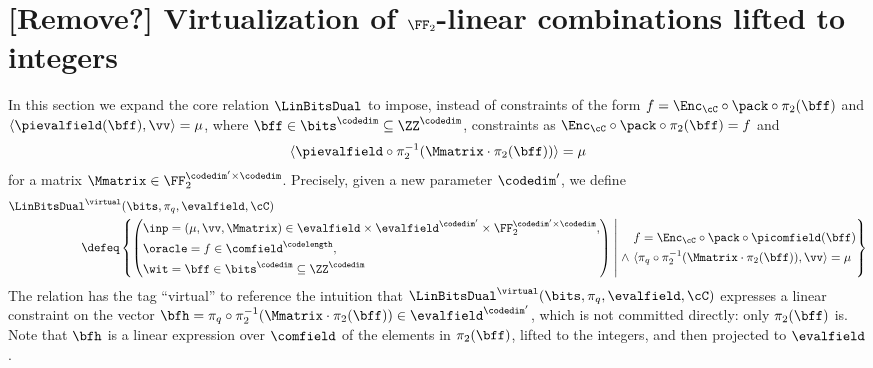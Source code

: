 \section{[Remove?] Virtualization of $\FF_2$-linear combinations lifted to integers}\label{s:virtualization}



In this section we expand the core relation $\LinBitsDual$ to impose, instead of constraints of the form $f=\Enc_\cC\circ \pack\circ \pi_2(\bff)$ and $\langle \pievalfield(\bff), \vv  \rangle = \mu$, where $\bff\in \bits^{\codedim} \subseteq \ZZ^{\codedim}$, constraints as $\Enc_\cC\circ\pack\circ\pi_2(\bff) = f$  and $$\langle \pievalfield\circ \pi_2^{-1}(\Mmatrix\cdot \pi_2(\bff)) \rangle = \mu$$ for a matrix $\Mmatrix\in \FF_{2}^{\codedim' \times \codedim}$. Precisely, given a new parameter $\codedim'$, we define 
%
\begin{align*}
&\LinBitsDual^\virtual(\bits,\pi_q, \evalfield,\cC)\\ &\qquad \qquad \qquad \defeq \left\{ \left(\begin{aligned} &\inp=(\mu, \vv, \Mmatrix)\in \evalfield \times \evalfield^{\codedim'} \times \FF_2^{\codedim' \times \codedim}, \\&\oracle = f \in \comfield^\codelength, \\ &\wit= \bff\in \bits^\codedim \subseteq \ZZ^\codedim\end{aligned}\right) \;\middle|\;  \begin{aligned} &f=\Enc_{\cC}\circ \pack \circ \picomfield(\bff)\\ \wedge \  & \langle \pi_q\circ \pi_2^{-1}(\Mmatrix \cdot \pi_2(\bff)), \vv\rangle  = \mu  \end{aligned} \right\}
\end{align*}
%
The relation has the tag ``virtual'' to reference the intuition that  $\LinBitsDual^\virtual(\bits,\pi_q, \evalfield,\cC)$ expresses a linear constraint on the vector $\bfh=\pi_q\circ \pi_2^{-1}(\Mmatrix \cdot \pi_2(\bff))\in \evalfield^{\codedim'}$, which is not committed directly: only $\pi_2(\bff)$  is. Note that $\bfh$ is a linear expression over $\comfield$ of the elements in $\pi_2(\bff)$, lifted to the integers, and then projected to $\evalfield$.  %



